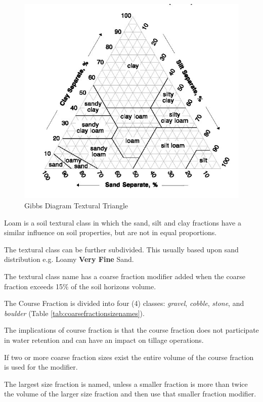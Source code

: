 \documentclass[letterpaper, 12pt]{article}
\begin{document}
\begin{figure}
    \centering
    \includegraphics{images/TexturalTriangle.jpg}
    \caption{Gibbs Diagram Textural Triangle}
    \label{fig:TexturalTriangle}
\end{figure}
    
Loam is a soil textural class in which the sand, silt and clay fractions have a similar influence on soil properties, but are not in equal proportions.
    
The textural class can be further subdivided. This usually based upon sand distribution e.g. Loamy \textbf{Very Fine} Sand.
    
The textural class name has a coarse fraction modifier added when the coarse fraction exceeds 15\% of the soil horizons volume.
    
The Course Fraction is divided into four (4) classes: \textit{gravel}, \textit{cobble}, \textit{stone}, and \textit{boulder} (Table \ref{tab:coarsefractionsizenames}).
    
The implications of course fraction is that the course fraction does not participate in water retention and can have an impact on tillage operations.
    
If two or more coarse fraction sizes exist the entire volume of the course fraction is used for the modifier.
    
The largest size fraction is named, unless a smaller fraction is more than twice the volume of the larger size fraction and then use that smaller fraction modifier.
\end{document}
